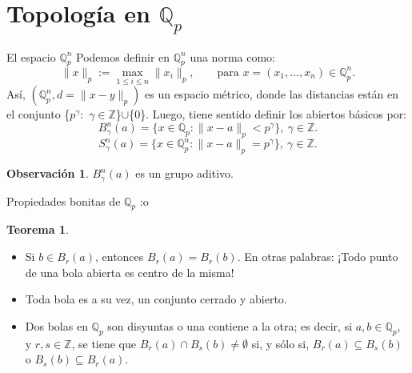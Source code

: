 \documentclass{beamer}
\newcommand{\bb}[1]{\mathbb{#1}}
\theoremstyle{definition}
\numberwithin{equation}{section}
\newcommand{\orangee}[1]{\textcolor{thColor}{#1}}
\newcommand{\redd}[1]{\textcolor{rkColor}{#1}}
\newtheorem{thh}{\orangee{Teorema}}
\newtheorem{rr}{\redd{Observación}}
\renewcommand{\leq}{\leqslant}
\newcommand{\Z}{\mathbb{Z}}
\newcommand{\Qp}{\mathbb{Q}_p}
\newcommand{\Qpn}{\mathbb{Q}_p^n}
\newcommand{\pnorm}[1]{\|#1\|_p}
\begin{document}
\section*{Topología en $\Qp$}
\begin{frame}{El espacio $\Qpn$}
	Podemos definir en $\Qpn$ una norma como:\[
	\pnorm{x}:=\max_{1\leq i\leq n}\pnorm{x_i},\qquad\text{para }x= (x_{1},\dots,x_{n})\in\Qpn.
	\]
	Así, $(\Qpn, d=\pnorm{x-y})$ es un espacio métrico, donde las distancias están en el conjunto \{$p^\gamma$$\colon$ $\gamma\in\Z$\}$\cup$\{$0$\}. Luego, tiene sentido definir los abiertos básicos por:
	 \[
	 B^n_{\gamma} (a)=\{x\in\Qp:\pnorm{x-a}< p^{\gamma}\},\ \gamma\in \mathbb{Z}.
	 \]
	 \[
	 S^n_{\gamma} (a)=\{x\in\Qpn:\pnorm{x-a}=p^{\gamma}\},\ \gamma\in \mathbb{Z}.
	 \]
	 \begin{rr}
	 	$B_\gamma^n (a)$ es un grupo aditivo.
	 \end{rr}
\end{frame}

\begin{frame}{Propiedades bonitas de $\Qp$ :o}
	\begin{thh}
	\begin{itemize}[<+- | alert@+>]
		\item \label{clopen1} Si $b\in B_{r} (a)$, entonces $B_{r} (a)=B_{r} (b)$. En otras palabras: ¡Todo  punto de una bola abierta es centro de la misma!
		\item Toda bola es a su vez, un conjunto cerrado y abierto.
		\item Dos bolas en $\Qp$ son disyuntas o una contiene a la otra; es decir, si $a,b \in \bb{Q}_p$, y $r,s\in \Z$, se tiene que $B_{r} (a)\cap B_{s} (b)\neq\emptyset$ si, y sólo si, $B_{r} (a)\subseteq B_{s} (b)$ o $B_{s} (b)\subseteq B_{r} (a)$.
	\end{itemize}	
	\end{thh}
	
	
\end{frame}
\end{document}

